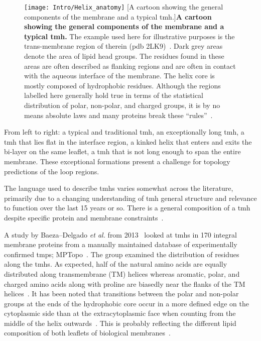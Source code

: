 \begin{figure}[!ht]
\centering
\texttt{[image: Intro/Helix\_anatomy]}
		[A cartoon showing the general components of the membrane and a typical \gls{tmh}.]{\textbf{A cartoon showing the general components of the membrane and a typical \gls{tmh}.}
The example used here for illustrative purposes is the trans-membrane region of therein (\gls{pdb} 2LK9)~\cite{Skasko2012}.
Dark grey areas denote the area of lipid head groups.
The residues found in these areas are often described as flanking regions and are often in contact with the aqueous interface of the membrane.
The helix core is mostly composed of hydrophobic residues.
Although the regions labelled here generally hold true in terms of the statistical distribution of polar, non-polar, and charged groups, it is by no means absolute laws and many proteins break these ``rules''~\cite{Sharpe2010, Baeza-Delgado2013, Pogozheva2013}.}

\label{fig:helixcartoon1}
\end{figure}

From left to right: a typical and traditional \gls{tmh}, an exceptionally long \gls{tmh}, a \gls{tmh} that lies flat in the interface region, a kinked helix that enters and exits the bi-layer on the same leaflet, a \gls{tmh} that is not long enough to span the entire membrane.
These exceptional formations present a challenge for topology predictions of the loop regions.

The language used to describe \gls{tmh}s varies somewhat across the literature, primarily due to a changing understanding of \gls{tmh} general structure and relevance to function over the last 15 years or so.
There is a general composition of a \gls{tmh} despite specific protein and membrane constraints~\cite{Sharpe2010}.

A study by Baeza\---Delgado \textit{ et al.} from 2013~\cite{Baeza-Delgado2013} looked at \gls{tmh}s in 170 integral membrane proteins from a manually maintained database of experimentally confirmed \gls{tmp}s; MPTopo~\cite{Jayasinghe2001}.
The group examined the distribution of residues along the \gls{tmh}s.
As expected, half of the natural amino acids are equally distributed along transmembrane (TM) helices whereas aromatic, polar, and charged amino acids along with proline are biasedly near the flanks of the TM helices~\cite{Baeza-Delgado2013}.
It has been noted that transitions between the polar and non-polar groups at the ends of the hydrophobic core occur in a more defined edge on the cytoplasmic side than at the extracytoplasmic face when counting from the middle of the helix outwards~\cite{Baeza-Delgado2013}.
This is probably reflecting the different lipid composition of both leaflets of biological membranes~\cite{Baeza-Delgado2013}.

